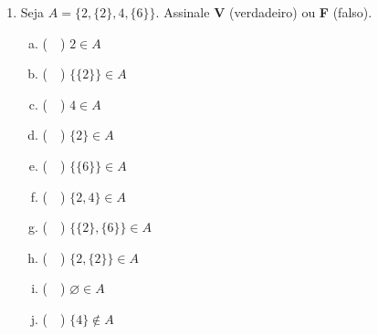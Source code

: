 \documentclass[a4paper,14pt]{article}
\begin{document}
\begin{multicols}{2}
\begin{enumerate}
\begin{enumerate}[a)]
			\end{enumerate}	
			\item Seja $A = \{2, \{2\}, 4, \{6\}\}$. Assinale \textbf{V} (verdadeiro) ou \textbf{F} (falso).
			\begin{enumerate}[a)]
				\item (~~) $2 \in A$
				\item (~~) $\{\{2\}\} \in A$
				\item (~~) $4 \in A$
				\item (~~) $\{2\} \in A$
				\item (~~) $\{\{6\}\} \in A$
				\item (~~) $\{2, 4\} \in A$
				\item (~~) $\{\{2\}, \{6\}\} \in A$
				\item (~~) $\{2, \{2\}\} \in A$
				\item (~~) $\varnothing \in A$
				\item (~~) $\{4\} \notin A$
			\end{enumerate}
		\end{enumerate}

\end{multicols}
\end{document}
